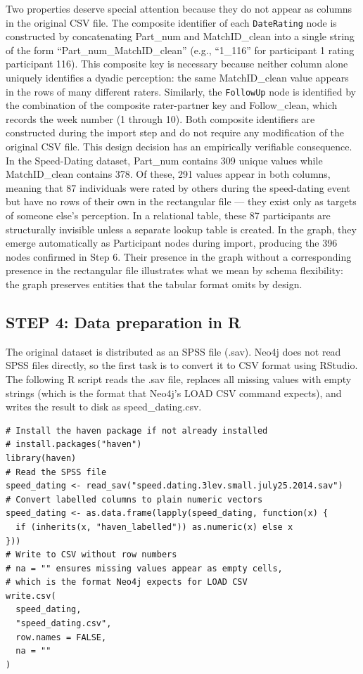 \documentclass[sn-apa,pdflatex]{sn-jnl}
\theoremstyle{remark}
\theoremstyle{definition}
\begin{document}
Two properties deserve special attention because they do not appear as
columns in the original CSV file. The composite identifier of each
\texttt{DateRating} node is constructed by concatenating Part\_num and
MatchID\_clean into a single string of the form
``Part\_num\_MatchID\_clean'' (e.g., ``1\_116'' for participant 1 rating
participant 116). This composite key is necessary because neither column
alone uniquely identifies a dyadic perception: the same MatchID\_clean
value appears in the rows of many different raters. Similarly, the
\texttt{FollowUp} node is identified by the combination of the composite
rater-partner key and Follow\_clean, which records the week number (1
through 10). Both composite identifiers are constructed during the
import step and do not require any modification of the original CSV
file. This design decision has an empirically verifiable consequence. In
the Speed-Dating dataset, Part\_num contains 309 unique values while
MatchID\_clean contains 378. Of these, 291 values appear in both
columns, meaning that 87 individuals were rated by others during the
speed-dating event but have no rows of their own in the rectangular file
--- they exist only as targets of someone else's perception. In a
relational table, these 87 participants are structurally invisible
unless a separate lookup table is created. In the graph, they emerge
automatically as Participant nodes during import, producing the 396
nodes confirmed in Step 6. Their presence in the graph without a
corresponding presence in the rectangular file illustrates what we mean
by schema flexibility: the graph preserves entities that the tabular
format omits by design.

\subsection{STEP 4: Data preparation in
R}\label{step-4-data-preparation-in-r}

The original dataset is distributed as an SPSS file (.sav). Neo4j does
not read SPSS files directly, so the first task is to convert it to CSV
format using RStudio. The following R script reads the .sav file,
replaces all missing values with empty strings (which is the format that
Neo4j's LOAD CSV command expects), and writes the result to disk as
speed\_dating.csv.

\begin{verbatim}
# Install the haven package if not already installed
# install.packages("haven")
library(haven)
# Read the SPSS file
speed_dating <- read_sav("speed.dating.3lev.small.july25.2014.sav")
# Convert labelled columns to plain numeric vectors
speed_dating <- as.data.frame(lapply(speed_dating, function(x) {
  if (inherits(x, "haven_labelled")) as.numeric(x) else x
}))
# Write to CSV without row numbers
# na = "" ensures missing values appear as empty cells,
# which is the format Neo4j expects for LOAD CSV
write.csv(
  speed_dating,
  "speed_dating.csv",
  row.names = FALSE,
  na = ""
)
\end{verbatim}
\end{document}
